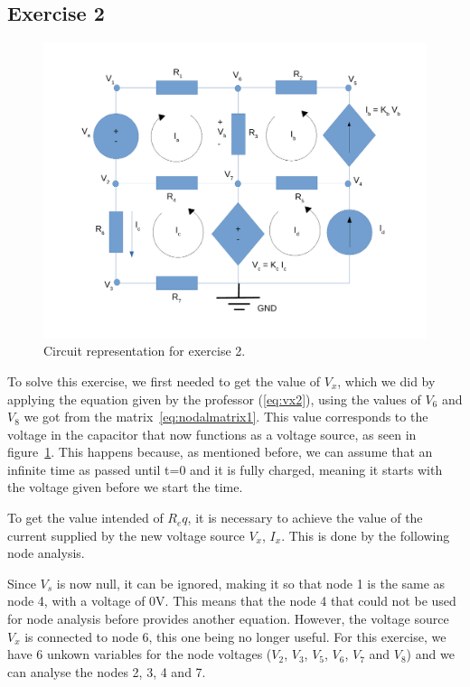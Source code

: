 \subsection{Exercise 2}
\label{sec:exercise2}



\label{sec:Exercise 2}
\begin{figure}[!ht] \centering
\includegraphics[width=0.8\linewidth]{circuit_mesh.pdf}
\caption{Circuit representation for exercise 2.}
\label{fig:nodeanalysis2}
\end{figure}

To solve this exercise, we first needed to get the value of $V_x$, which we did by applying the equation given by the professor (\ref{eq:vx2}), using the values of $V_6$ and $V_8$ we got from the matrix~\ref{eq:nodalmatrix1}. This value corresponds to the voltage in the capacitor that now functions as a voltage source, as seen in figure~\ref{fig:nodeanalysis2}. This happens because, as mentioned before, we can assume that an infinite time as passed until t=0 and it is fully charged, meaning it starts with the voltage given before we start the time.

To get the value intended of $R_eq$, it is necessary to achieve the value of the current supplied by the new voltage source $V_x$, $I_x$. This is done by the following node analysis.

Since $V_s$ is now null, it can be ignored, making it so that node 1 is the same as node 4, with a voltage of 0V. This means that the node 4 that could not be used for node analysis before provides another equation. However, the voltage source $V_x$ is connected to node 6, this one being no longer useful. For this exercise, we have 6 unkown variables for the node voltages ($V_2$, $V_3$, $V_5$, $V_6$, $V_7$ and $V_8$) and we can analyse the nodes 2, 3, 4 and 7.

